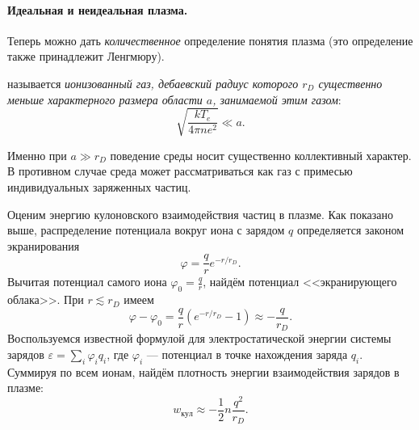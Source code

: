 

\paragraph{Идеальная и неидеальная плазма.}
Теперь можно дать \emph{количественное} определение понятия плазма
(это определение также принадлежит Ленгмюру).

 называется \emph{ионизованный газ, дебаевский радиус которого
    $r_D$ существенно меньше характерного размера области $a$, занимаемой этим газом}:
\begin{equation*}
	\sqrt{\frac{kT_e}{4\pi ne^2}}\ll a.
\end{equation*}

Именно при $a\gg r_D$ поведение среды носит существенно коллективный характер.
В противном случае среда может рассматриваться как газ с примесью индивидуальных
заряженных частиц.

Оценим энергию кулоновского взаимодействия частиц в плазме.
Как показано выше, распределение потенциала вокруг иона с зарядом $q$
определяется законом экранирования
\[
\varphi = \frac{q}{r} e^{-r/r_D}.
\]
Вычитая потенциал самого иона $\varphi_0=\frac{q}{r}$, найдём
потенциал <<экранирующего облака>>. При $r\lesssim r_D$ имеем
\[
\varphi-\varphi_0 = \frac{q}{r}\left( e^{-r/r_D} - 1\right)
\approx - \frac{q}{r_D}.
\]
Воспользуемся известной формулой для электростатической энергии системы
зарядов $\varepsilon=\sum_i \varphi_i q_i$, где $\varphi_i$ --- потенциал
в точке нахождения заряда $q_i$. Суммируя по всем ионам,
найдём плотность энергии взаимодействия зарядов в плазме:
\begin{equation}
w_{кул} \approx -\frac12 n \frac{q^2}{r_D}.
\end{equation}

